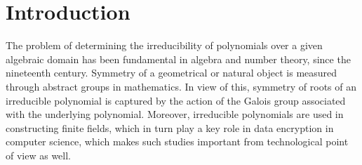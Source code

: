 \documentclass[12pt]{amsart}%
\begin{document}
\section{Introduction}
The problem of determining the irreducibility of polynomials over a given algebraic domain has been fundamental in algebra and number theory, since the nineteenth century. Symmetry of a geometrical or natural object is  measured through abstract groups in mathematics. In view of this, symmetry of roots of an irreducible polynomial is captured by the action of the Galois group associated with the underlying polynomial. Moreover, irreducible polynomials are used in constructing finite fields, which in turn play a key role in data encryption in computer science, which makes such studies important from technological point of view as well.
\end{document}
